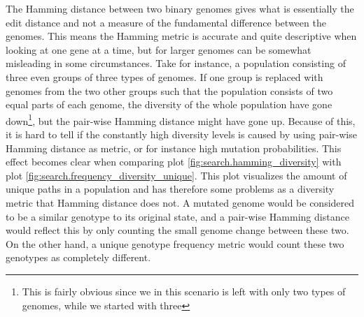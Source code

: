 The Hamming distance between two binary genomes gives what is essentially the edit distance and not a measure of the fundamental difference between the genomes. This means the Hamming metric is accurate and quite descriptive when looking at one gene at a time, but for larger genomes can be somewhat misleading in some circumstances. Take for instance, a population consisting of three even groups of three types of genomes. If one group is replaced with genomes from the two other groups such that the population consists of two equal parts of each genome, the diversity of the whole population have gone down\footnote{This is fairly obvious since we in this scenario is left with only two types of genomes, while we started with three}, but the pair-wise Hamming distance might have gone up. Because of this, it is hard to tell if the constantly high diversity levels is caused by using pair-wise Hamming distance as metric, or for instance high mutation probabilities. This effect becomes clear when comparing plot \ref{fig:search.hamming_diversity} with plot \ref{fig:search.frequency_diversity_unique}. This plot visualizes the amount of unique paths in a population and has therefore some problems as a diversity metric that Hamming distance does not. A mutated genome would be considered to be a similar genotype to its original state, and a pair-wise Hamming distance would reflect this by only counting the small genome change between these two. On the other hand, a unique genotype frequency metric would count these two genotypes as completely different.

